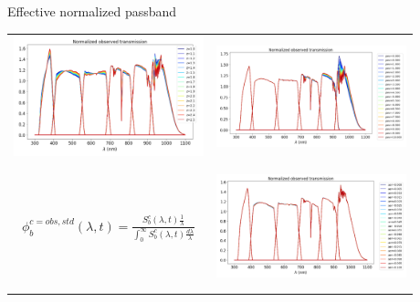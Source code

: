 \documentclass{beamer}
\begin{document}
\begin{frame}{Effective normalized passband}
\begin{tabular}{cc}
\includegraphics[width=5.5cm,height=3.5cm,angle=0]{figs/PCCorr/fig1_PCCorrOrder1_airmass.png}
&
\includegraphics[width=5.5cm,height=3.5cm,angle=0]{figs/PCCorr/fig2_PCCorrOrder1_PWV.png} \\
 $\boxed{\phi_b^{c=obs,std} (\lambda,t) = \frac{S_b^{c}(\lambda,t)\frac{1}{\lambda}}{\int_0^\infty S^{c}_b(\lambda,t) \frac{d\lambda}{\lambda}}}$ & \includegraphics[width=5.5cm,height=3.5cm,angle=0]{figs/PCCorr/fig3_PCCorrOrder1_aer.png}
\end{tabular}
\end{frame}
\end{document}
